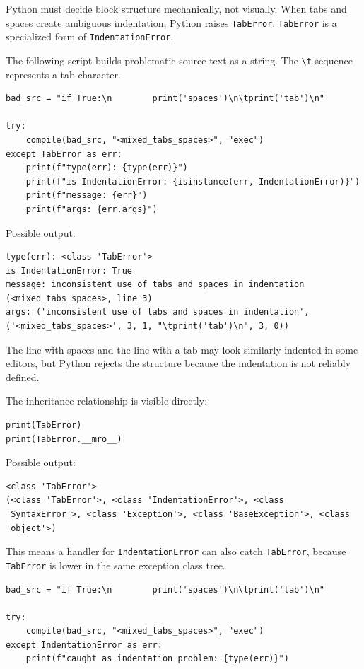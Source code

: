 Python must decide block structure mechanically, not visually. When tabs and spaces create ambiguous indentation, Python raises \texttt{TabError}. \texttt{TabError} is a specialized form of \texttt{IndentationError}.

The following script builds problematic source text as a string. The \texttt{\textbackslash t} sequence represents a tab character.

\begin{verbatim}
bad_src = "if True:\n        print('spaces')\n\tprint('tab')\n"

try:
    compile(bad_src, "<mixed_tabs_spaces>", "exec")
except TabError as err:
    print(f"type(err): {type(err)}")
    print(f"is IndentationError: {isinstance(err, IndentationError)}")
    print(f"message: {err}")
    print(f"args: {err.args}")
\end{verbatim}

Possible output:

\begin{verbatim}
type(err): <class 'TabError'>
is IndentationError: True
message: inconsistent use of tabs and spaces in indentation (<mixed_tabs_spaces>, line 3)
args: ('inconsistent use of tabs and spaces in indentation', ('<mixed_tabs_spaces>', 3, 1, "\tprint('tab')\n", 3, 0))
\end{verbatim}

The line with spaces and the line with a tab may look similarly indented in some editors, but Python rejects the structure because the indentation is not reliably defined.

The inheritance relationship is visible directly:

\begin{verbatim}
print(TabError)
print(TabError.__mro__)
\end{verbatim}

Possible output:

\begin{verbatim}
<class 'TabError'>
(<class 'TabError'>, <class 'IndentationError'>, <class 'SyntaxError'>, <class 'Exception'>, <class 'BaseException'>, <class 'object'>)
\end{verbatim}

This means a handler for \texttt{IndentationError} can also catch \texttt{TabError}, because \texttt{TabError} is lower in the same exception class tree.

\begin{verbatim}
bad_src = "if True:\n        print('spaces')\n\tprint('tab')\n"

try:
    compile(bad_src, "<mixed_tabs_spaces>", "exec")
except IndentationError as err:
    print(f"caught as indentation problem: {type(err)}")
\end{verbatim}


